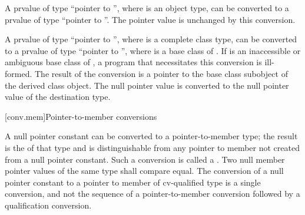 \pnum
A prvalue of type ``pointer to \cv{} '', where 
is an object type, can be converted to a prvalue of type ``pointer to
\cv{} ''.
The pointer value is unchanged by this conversion.

\pnum
A prvalue of type ``pointer to \cv{} '', where 
is a complete class type, can be converted to a prvalue of type ``pointer to
\cv{} '', where  is a base class
of . If  is an
inaccessible or
ambiguous base class of , a program
that necessitates this conversion is ill-formed. The result of the
conversion is a pointer to the base class subobject of the derived class
object. The null pointer value is converted to the null pointer value of
the destination type.

[conv.mem]{Pointer-to-member conversions}

\pnum
{}%
%
%
A null pointer constant can be converted to a
pointer-to-member
type; the result is the 
of that type and is distinguishable from any pointer to member not
created from a null pointer constant.
Such a conversion is called a .
Two null member pointer values of
the same type shall compare equal. The conversion of a null pointer
constant to a pointer to member of cv-qualified type is a single
conversion, and not the sequence of a pointer-to-member conversion
followed by a qualification conversion.

